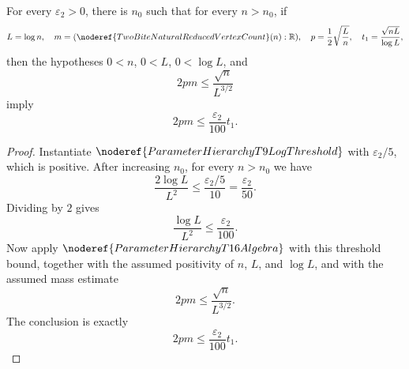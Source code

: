 \begin{helper}
For every \(\varepsilon_2>0\), there is \(n_0\) such that for every
\(n>n_0\), if
\[
L=\log n,\quad
m=(\noderef{TwoBiteNaturalReducedVertexCount}(n):\mathbb R),\quad
p=\frac12\sqrt{\frac Ln},\quad
t_1=\frac{\sqrt{nL}}{\log L},
\]
then the hypotheses \(0<n\), \(0<L\), \(0<\log L\), and
\[
2pm\le\frac{\sqrt n}{L^{3/2}}
\]
imply
\[
2pm\le\frac{\varepsilon_2}{100}t_1.
\]
\end{helper}
\begin{proof}
Instantiate \(\noderef{ParameterHierarchyT9LogThreshold}\) with
\(\varepsilon_2/5\), which is positive.  After increasing \(n_0\), for every
\(n>n_0\) we have
\[
\frac{2\log L}{L^2}\le \frac{\varepsilon_2/5}{10}
=\frac{\varepsilon_2}{50}.
\]
Dividing by \(2\) gives
\[
\frac{\log L}{L^2}\le\frac{\varepsilon_2}{100}.
\]
Now apply \(\noderef{ParameterHierarchyT16Algebra}\) with this threshold
bound, together with the assumed positivity of \(n\), \(L\), and \(\log L\),
and with the assumed mass estimate
\[
2pm\le\frac{\sqrt n}{L^{3/2}}.
\]
The conclusion is exactly
\[
2pm\le\frac{\varepsilon_2}{100}t_1.
\]
\end{proof}

